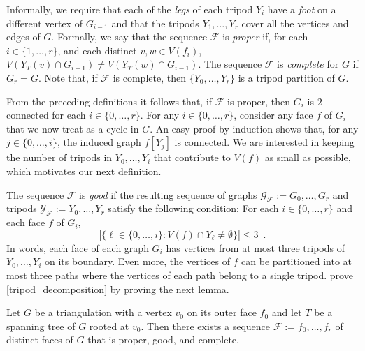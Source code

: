 \documentclass{patmorin}
\begin{document}
Informally, we require that each of the \emph{legs} of each tripod $Y_i$ have  a \emph{foot} on a different vertex of $G_{i-1}$ and that the tripods $Y_1,\ldots,Y_r$ cover all the vertices and edges of $G$. Formally, we say that the sequence $\mathcal{F}$ is \emph{proper} if, for each $i\in\{1,\ldots,r\}$, and each distinct $v,w\in V(f_i)$, $V(Y_T(v)\cap G_{i-1})\neq V(Y_T(w)\cap G_{i-1})$.  The sequence $\mathcal{F}$ is \emph{complete} for $G$ if $G_r=G$.  Note that, if $\mathcal{F}$ is complete, then $\{Y_0,\ldots,Y_r\}$ is a tripod partition of $G$.

From the preceding definitions it follows that, if $\mathcal{F}$ is proper, then  $G_i$ is $2$-connected for each $i\in\{0,\ldots,r\}$.  For any $i\in\{0,\ldots,r\}$, consider any face $f$ of $G_i$ that we now treat as a cycle in $G$. An easy proof by induction shows that, for any $j\in\{0,\ldots,i\}$, the induced graph $f[Y_j]$ is connected. %
We are interested in keeping the number of tripods in $Y_0,\ldots,Y_i$ that contribute to $V(f)$ as small as possible, which motivates our next definition.

The sequence $\mathcal{F}$ is \emph{good} if the resulting sequence of graphs $\mathcal{G}_\mathcal{F}:=G_0,\ldots,G_r$ and tripods $\mathcal{Y}_\mathcal{F}:=Y_0,\ldots,Y_r$ satisfy the following condition:  For each $i\in\{0,\ldots, r\}$ and each face $f$ of $G_i$,
\[
   |\{\ell\in\{0,\ldots,i\}: V(f)\cap Y_{\ell}\neq\emptyset\}|\le 3 \enspace .
\]
In words, each face of each graph $G_i$ has vertices from at most three tripods of $Y_0,\ldots,Y_i$ on its boundary.  Even more, the vertices of $f$ can be partitioned into at most three paths where the vertices of each path belong to a single tripod. \citet{dujmovic.joret.ea:planar} prove \cref{tripod_decomposition} by proving the next lemma.


\begin{lem}\label{face_trick}
  Let $G$ be a triangulation with a vertex $v_0$ on its outer face $f_0$ and let $T$ be a spanning tree of $G$ rooted at $v_0$.  Then there exists a sequence $\mathcal{F}:=f_0,\ldots,f_{r}$ of distinct faces of $G$ that is proper, good, and complete.
\end{lem}
\end{document}
